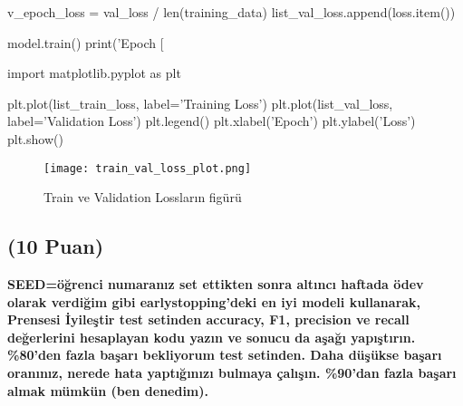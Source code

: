 \documentclass[11pt]{article}
\begin{document}
\begin{python}
        v_epoch_loss = val_loss / len(training_data)
        list_val_loss.append(loss.item())

            
    model.train()
    print('Epoch [%

import matplotlib.pyplot as plt

plt.plot(list_train_loss, label='Training Loss')
plt.plot(list_val_loss, label='Validation Loss')
plt.legend()
plt.xlabel('Epoch')
plt.ylabel('Loss')
plt.show()


\end{python}


\begin{figure}[ht!]
    \centering
    \texttt{[image: train\_val\_loss\_plot.png]}
    \caption{Train ve Validation Lossların figürü}
    \label{fig:my_pic}
\end{figure}


\subsection{(10 Puan)} \textbf{SEED=öğrenci numaranız set ettikten sonra altıncı haftada ödev olarak verdiğim gibi earlystopping'deki en iyi modeli kullanarak, Prensesi İyileştir test setinden accuracy, F1, precision ve recall değerlerini hesaplayan kodu yazın ve sonucu da aşağı yapıştırın. \%80'den fazla başarı bekliyorum test setinden. Daha düşükse başarı oranınız, nerede hata yaptığınızı bulmaya çalışın. \%90'dan fazla başarı almak mümkün (ben denedim).}
\end{document}

